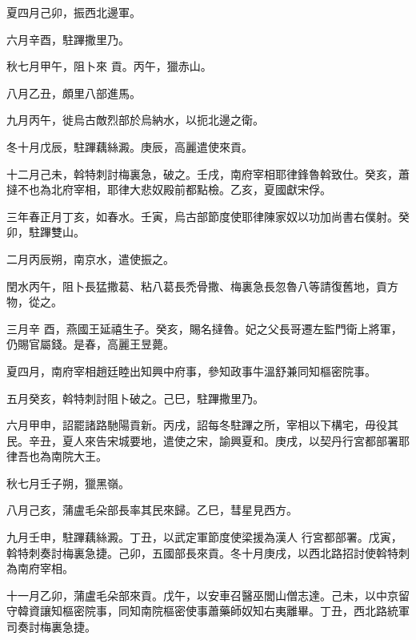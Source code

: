 \begin{pinyinscope}
 夏四月己卯，振西北邊軍。



 六月辛酉，駐蹕撒里乃。



 秋七月甲午，阻卜來
 貢。丙午，獵赤山。



 八月乙丑，頗里八部進馬。



 九月丙午，徙烏古敵烈部於烏納水，以扼北邊之衛。



 冬十月戊辰，駐蹕藕絲澱。庚辰，高麗遣使來貢。



 十二月己未，斡特刺討梅裏急，破之。壬戌，南府宰相耶律鋒魯斡致仕。癸亥，蕭撻不也為北府宰相，耶律大悲奴殿前都點檢。乙亥，夏國獻宋俘。



 三年春正月丁亥，如春水。壬寅，烏古部節度使耶律陳家奴以功加尚書右僕射。癸卯，駐蹕雙山。



 二月丙辰朔，南京水，遣使振之。



 閏水丙午，阻卜長猛撒葛、粘八葛長禿骨撒、梅裏急長忽魯八等請復舊地，貢方物，從之。



 三月辛
 酉，燕國王延禧生子。癸亥，賜名撻魯。妃之父長哥遷左監門衛上將軍，仍賜官屬錢。是春，高麗王昱薨。



 夏四月，南府宰相趙廷睦出知興中府事，參知政事牛溫舒兼同知樞密院事。



 五月癸亥，斡特刺討阻卜破之。己巳，駐蹕撒里乃。



 六月甲申，詔罷諸路馳陽貢新。丙戌，詔每冬駐蹕之所，宰相以下構宅，毋役其民。辛丑，夏人來告宋城要地，遣使之宋，諭興夏和。庚戌，以契丹行宮都部署耶律吾也為南院大王。



 秋七月壬子朔，獵黑嶺。



 八月己亥，蒲盧毛朵部長率其民來歸。乙巳，彗星見西方。



 九月壬申，駐蹕藕絲澱。丁丑，以武定軍節度使梁援為漢人
 行宮都部署。戊寅，斡特刺奏討梅裏急捷。己卯，五國部長來貢。冬十月庚戌，以西北路招討使斡特刺為南府宰相。



 十一月乙卯，蒲盧毛朵部來貢。戊午，以安車召醫巫閭山僧志達。己未，以中京留守韓資讓知樞密院事，同知南院樞密使事蕭藥師奴知右夷離畢。丁丑，西北路統軍司奏討梅裏急捷。




\end{pinyinscope}

